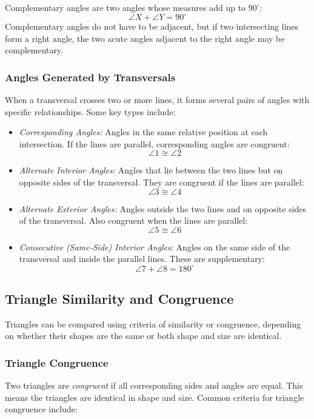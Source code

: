 Complementary angles are two angles whose measures add up to \(90^\circ\):
\[
\angle X + \angle Y = 90^\circ
\]
Complementary angles do not have to be adjacent, but if two intersecting lines form a right angle, the two acute angles adjacent to the right angle may be complementary.

\subsubsection*{Angles Generated by Transversals}

When a transversal crosses two or more lines, it forms several pairs of angles with specific relationships. Some key types include:

\begin{itemize}[label=\(-\)]
    \item \emph{Corresponding Angles:} Angles in the same relative position at each intersection. If the lines are parallel, corresponding angles are congruent:
    \[
    \angle 1 \cong \angle 2
    \]
    
    \item \emph{Alternate Interior Angles:} Angles that lie between the two lines but on opposite sides of the transversal. They are congruent if the lines are parallel:
    \[
    \angle 3 \cong \angle 4
    \]
    
    \item \emph{Alternate Exterior Angles:} Angles outside the two lines and on opposite sides of the transversal. Also congruent when the lines are parallel:
    \[
    \angle 5 \cong \angle 6
    \]
    
    \item \emph{Consecutive (Same-Side) Interior Angles:} Angles on the same side of the transversal and inside the parallel lines. These are supplementary:
    \[
    \angle 7 + \angle 8 = 180^\circ
    \]
\end{itemize}

\subsection{Triangle Similarity and Congruence}
Triangles can be compared using criteria of similarity or congruence, depending on whether their shapes are the same or both shape and size are identical.

\subsubsection{Triangle Congruence}
Two triangles are \emph{congruent} if all corresponding sides and angles are equal. This means the triangles are identical in shape and size. Common criteria for triangle congruence include:

